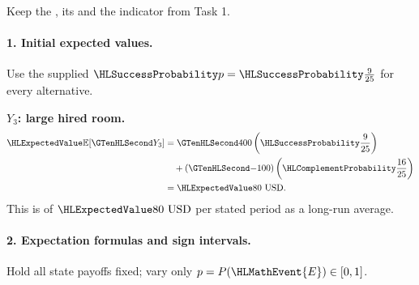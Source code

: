 Keep the , its  and the indicator from Task 1.
\paragraph{1. Initial expected values.}
Use the supplied $\SuccessProb{p}=\SuccessProb{\frac{9}{25}}$ for every alternative.
\noindent\begin{minipage}[t]{.48\linewidth}
\textbf{$Y_3$: large hired room.}
\[
\begin{aligned}
\ExpectedValue{\mathbb E}[\Money{Y_3}]&=\Money{400}\left(\SuccessProb{\frac{9}{25}}\right)\\
&\quad +(\Money{-100})\left(\FailureProb{\frac{16}{25}}\right)\\
&=\ExpectedValue{80\ \text{USD}}.
\end{aligned}
\]
This is  of $\ExpectedValue{80\ \text{USD}}$ per stated period as a long-run average.
\end{minipage}\par
{}\paragraph{2. Expectation formulas and sign intervals.}
Hold all state payoffs fixed; vary only $p=P(\HLMathEvent{E})\in\left[0,1\right]$.
